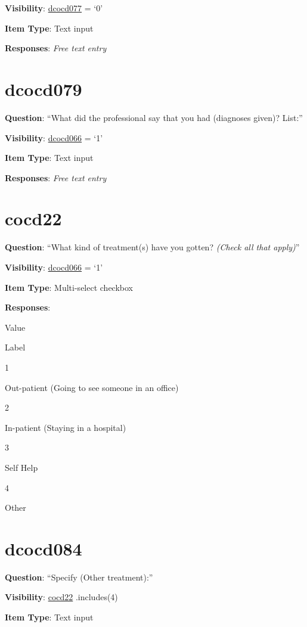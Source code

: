 \documentclass[]{book}
\begin{document}
\textbf{Visibility}: \protect\hyperlink{dcocd077}{dcocd077} = `0'

\textbf{Item Type}: Text input

\textbf{Responses}: \emph{Free text entry}

\hypertarget{dcocd079}{%
\section{dcocd079}\label{dcocd079}}

\textbf{Question}: ``What did the professional say that you had (diagnoses given)? List:''

\textbf{Visibility}: \protect\hyperlink{dcocd066}{dcocd066} = `1'

\textbf{Item Type}: Text input

\textbf{Responses}: \emph{Free text entry}

\hypertarget{cocd22}{%
\section{cocd22}\label{cocd22}}

\textbf{Question}: ``What kind of treatment(s) have you gotten? \emph{(Check all that apply)}''

\textbf{Visibility}: \protect\hyperlink{dcocd066}{dcocd066} = `1'

\textbf{Item Type}: Multi-select checkbox

\textbf{Responses}:

Value

Label

1

Out-patient (Going to see someone in an office)

2

In-patient (Staying in a hospital)

3

Self Help

4

Other

\hypertarget{dcocd084}{%
\section{dcocd084}\label{dcocd084}}

\textbf{Question}: ``Specify (Other treatment):''

\textbf{Visibility}: \protect\hyperlink{cocd22}{cocd22} .includes(4)

\textbf{Item Type}: Text input
\end{document}
